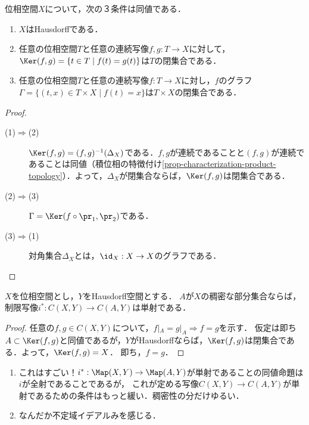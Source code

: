 \documentclass[uplatex,dvipdfmx]{jsreport}
\begin{document}
\begin{proposition}\label{prop-characterization-of-Hausdorff-in-terms-of-equalizer}
    位相空間$X$について，次の３条件は同値である．
    \begin{enumerate}
        \item $X$はHausdorffである．
        \item 任意の位相空間$T$と任意の連続写像$f,g:T\to X$に対して，$\Ker(f,g)=\{t\in T\mid f(t)=g(t)\}$は$T$の閉集合である．
        \item 任意の位相空間$T$と任意の連続写像$f:T\to X$に対し，$f$のグラフ$\Gamma=\{(t,x)\in T\times X\mid f(t)=x\}$は$T\times X$の閉集合である．
    \end{enumerate}
\end{proposition}
\begin{proof}\mbox{}
    \begin{description}
        \item[(1)$\Rightarrow$(2)] 
        $\Ker(f,g)=(f,g)^{-1}(\Delta_X)$である．$f,g$が連続であることと$(f,g)$が連続であることは同値（積位相の特徴付け\ref{prop-characterization-product-topology}）．よって，$\Delta_X$が閉集合ならば，$\Ker(f,g)$は閉集合である．
        \item[(2)$\Rightarrow$(3)] 
        $\Gamma=\Ker(f\circ\pr_1,\pr_2)$である．
        \item[(3)$\Rightarrow$(1)] 
        対角集合$\Delta_X$とは，$\id_X:X\to X$のグラフである．
    \end{description}
\end{proof}

\begin{corollary}\label{cor-Hausdorff空間への連続写像は，稠密な部分集合への制限で一意的に定まる}
    $X$を位相空間とし，$Y$をHausdorff空間とする．
    $A$が$X$の稠密な部分集合ならば，制限写像$i^*:C(X,Y)\to C(A,Y)$は単射である．
\end{corollary}
\begin{proof}
    任意の$f,g\in C(X,Y)$について，$f|_A=g|_A\Rightarrow f=g$を示す．
    仮定は即ち$A\subset\Ker(f,g)$と同値であるが，$Y$がHausdorffならば，$\Ker(f,g)$は閉集合である．よって，$\Ker(f,g)=X$．
    即ち，$f=g$．
\end{proof}
\begin{remarks}[稠密性の分だけゆるい！]\mbox{}
    \begin{enumerate}
        \item これはすごい！$i^*:\Map(X,Y)\to\Map(A,Y)$が単射であることの同値命題は$i$が全射であることであるが，
        これが定める写像$C(X,Y)\to C(A,Y)$が単射であるための条件はもっと緩い．稠密性の分だけゆるい．
        \item なんだか不定域イデアルみを感じる．
    \end{enumerate}
\end{remarks}
\end{document}
